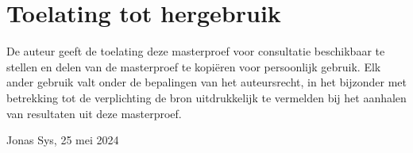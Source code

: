 \chapter*{Toelating tot hergebruik}
De auteur geeft de toelating deze masterproef voor consultatie beschikbaar te stellen en delen van de masterproef te kopiëren voor persoonlijk gebruik.
Elk ander gebruik valt onder de bepalingen van het auteursrecht, in het bijzonder met betrekking tot de verplichting de bron uitdrukkelijk te vermelden bij het aanhalen van resultaten uit deze masterproef.

\vspace{5mm}

Jonas Sys, 25 mei 2024